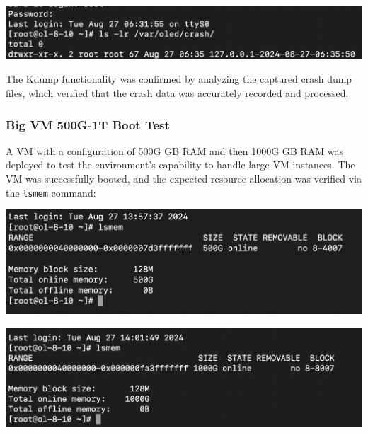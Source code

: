 \begin{center}
    \centering
    \includegraphics[width=\textwidth]{Images/Kdumpt Result folder.png}
    \label{fig}
\end{center}

The Kdump functionality was confirmed by analyzing the captured crash dump files, which verified that the crash data was accurately recorded and processed.

\subsubsection[Big VM 500G-1T Boot Test]{Big VM 500G-1T Boot Test}

A VM with a configuration of 500G GB RAM and then 1000G GB RAM was deployed to test the environment's capability to handle large VM instances. The VM was successfully booted, and the expected resource allocation was verified via the \texttt{lsmem} command:

\begin{center}
    \centering
    \includegraphics[width=\textwidth]{Images/Large VM Test 500G.png}
    \label{fig}
\end{center}

\begin{center}
    \centering
    \includegraphics[width=\textwidth]{Images/Large VM Test 1T.png}
    \label{fig}
\end{center}

